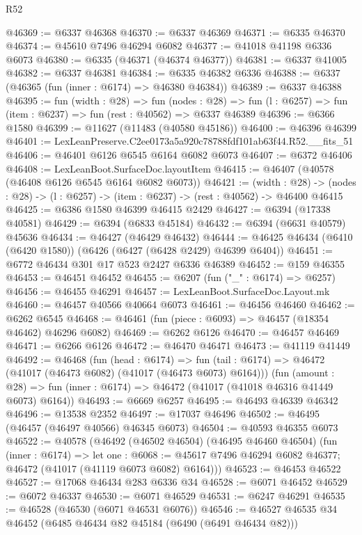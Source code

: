 \begin{lexlean}{R52}
\begin{coremodule}
@46369 := @6337 @46368
@46370 := @6337 @46369
@46371 := @6335 @46370
@46374 := @45610 @7496 @46294 @6082
@46377 := @41018 @41198 @6336 @6073
@46380 := @6335 (@46371 (@46374 @46377))
@46381 := @6337 @41005
@46382 := @6337 @46381
@46384 := @6335 @46382 @6336
@46388 := @6337 (@46365 (fun (inner : @6174) => @46380 @46384))
@46389 := @6337 @46388
@46395 := fun (width : @28) =>
  fun (nodes : @28) => fun (l : @6257) => fun (item : @6237) => fun (rest : @40562) => @6337 @46389
@46396 := @6366 @1580
@46399 := @11627 (@11483 (@40580 @45186))
@46400 := @46396 @46399
@46401 := LexLeanPreserve.C2ee0173a5a920c78788fdf101ab63f44.R52.__fits_51
@46406 := @46401 @6126 @6545 @6164 @6082 @6073
@46407 := @6372 @46406
@46408 := LexLeanBoot.SurfaceDoc.layoutItem
@46415 := @46407 (@40578 (@46408 @6126 @6545 @6164 @6082 @6073))
@46421 := (width : @28) ->
  (nodes : @28) -> (l : @6257) -> (item : @6237) -> (rest : @40562) -> @46400 @46415
@46425 := @6386 @1580 @46399 @46415 @2429
@46427 := @6394 (@17338 @40581)
@46429 := @6394 (@6833 @45184)
@46432 := @6394 (@6631 @40579) @45636
@46434 := @46427 (@46429 @46432)
@46444 := @46425 @46434 (@6410 (@6420 @1580)) (@6426 (@6427 (@6428 @2429) @46399 @6404))
@46451 := @6772 @46434 @301 @17 @523 @2427 @6336 @46389
@46452 := @159 @46355
@46453 := @46451 @46452
@46455 := @6207 (fun ("_" : @6174) => @6257)
@46456 := @46455 @46291
@46457 := LexLeanBoot.SurfaceDoc.Layout.mk
@46460 := @46457 @40566 @40664 @6073
@46461 := @46456 @46460
@46462 := @6262 @6545
@46468 := @46461 (fun (piece : @6093) => @46457 (@18354 @46462) @46296 @6082)
@46469 := @6262 @6126
@46470 := @46457 @46469
@46471 := @6266 @6126
@46472 := @46470 @46471
@46473 := @41119 @41449
@46492 := @46468
    (fun (head : @6174) =>
    fun (tail : @6174) => @46472 (@41017 (@46473 @6082) (@41017 (@46473 @6073) @6164)))
    (fun (amount : @28) =>
    fun (inner : @6174) => @46472 (@41017 (@41018 @46316 @41449 @6073) @6164))
@46493 := @6669 @6257
@46495 := @46493 @46339 @46342
@46496 := @13538 @2352
@46497 := @17037 @46496
@46502 := @46495 (@46457 (@46497 @40566) @46345 @6073)
@46504 := @40593 @46355 @6073
@46522 := @40578
    (@46492
      (@46502 @46504)
      (@46495 @46460 @46504)
      (fun (inner : @6174) =>
      let one : @6068 := @45617 @7496 @46294 @6082 @46377;
      @46472 (@41017 (@41119 @6073 @6082) @6164)))
@46523 := @46453 @46522
@46527 := @17068 @46434 @283 @6336 @34
@46528 := @6071 @46452
@46529 := @6072 @46337
@46530 := @6071 @46529
@46531 := @6247 @46291
@46535 := @46528 (@46530 (@6071 @46531 @6076))
@46546 := @46527 @46535 @34 @46452 (@6485 @46434 @82 @45184 (@6490 (@6491 @46434 @82)))

\end{coremodule}
\end{lexlean}
